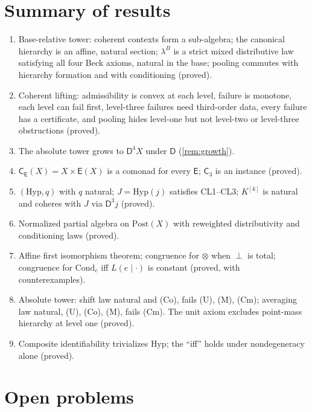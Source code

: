\documentclass[11pt]{article}
\theoremstyle{definition}
\theoremstyle{remark}
\newcommand{\D}{\mathsf{D}}
\newcommand{\Hyp}{\mathrm{Hyp}}
\newcommand{\Post}{\mathrm{Post}}
\newcommand{\Cond}{\mathrm{Cond}}
\newcommand{\C}{\mathsf{C}}
\newcommand{\E}{\mathsf{E}}
\begin{document}
\section{Summary of results}

\begin{enumerate}[leftmargin=*]
\item Base-relative tower: coherent contexts form a sub-algebra; the canonical hierarchy is an
  affine, natural section; $\lambda^B$ is a strict mixed distributive law satisfying all four Beck
  axioms, natural in the base; pooling commutes with hierarchy formation and with conditioning
  (proved).
\item Coherent lifting: admissibility is convex at each level, failure is monotone, each level can
  fail first, level-three failures need third-order data, every failure has a certificate, and pooling
  hides level-one but not level-two or level-three obstructions (proved).
\item The absolute tower grows to $\D^4X$ under $\D$ (\cref{rem:growth}).
\item $\C_\E(X)=X\times\E(X)$ is a comonad for every $\E$; $\C_3$ is an instance (proved).
\item $(\Hyp,q)$ with $q$ natural; $J=\Hyp(j)$ satisfies CL1--CL3; $K^{[k]}$ is natural and coheres
  with $J$ via $\D^3j$ (proved).
\item Normalized partial algebra on $\Post(X)$ with reweighted distributivity and conditioning laws
  (proved).
\item Affine first isomorphism theorem; congruence for $\otimes$ when $\perp$ is total; congruence for
  $\Cond_e$ iff $L(e\mid\cdot)$ is constant (proved, with counterexamples).
\item Absolute tower: shift law natural and (Co), fails (U), (M), (Cm); averaging law natural,
  (U), (Co), (M), fails (Cm). The unit axiom excludes point-mass hierarchy at level one (proved).
\item Composite identifiability trivializes $\Hyp$; the ``iff'' holds under nondegeneracy alone (proved).
\end{enumerate}

\section{Open problems}
\end{document}
